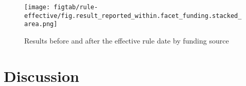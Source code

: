 \documentclass[10pt]{article}
\begin{document}
\begin{figure}
	\texttt{[image: figtab/rule-effective/fig.result\_reported\_within.facet\_funding.stacked\_area.png]}
	\label{fig:results-reported-rule-effective-funding}
	\caption{Results before and after the effective rule date by funding source}
\end{figure}


\section{Discussion}

\printbibliography
\end{document}
